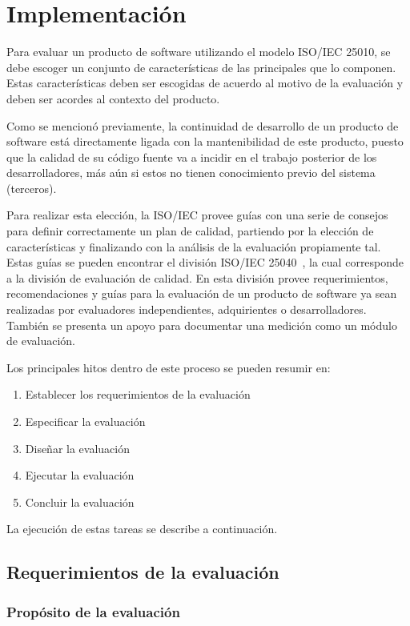 \chapter{Implementación}
Para evaluar un producto de software utilizando el modelo ISO/IEC 25010, se debe escoger un conjunto
de características de las principales que lo componen. Estas características deben ser escogidas de acuerdo
al motivo de la evaluación y deben ser acordes al contexto del producto.

Como se mencionó previamente, la continuidad de desarrollo de un producto de software está directamente
ligada con la mantenibilidad de este producto, puesto que la calidad de su código fuente va a incidir
en el trabajo posterior de los desarrolladores, más aún si estos no tienen conocimiento previo del sistema
(terceros).

Para realizar esta elección, la ISO/IEC provee guías con una serie de consejos para definir correctamente
un plan de calidad, partiendo por la elección de características y finalizando con la análisis de la evaluación
propiamente tal. Estas guías se pueden encontrar el división ISO/IEC 25040~\cite{25040}, la cual corresponde a la división
de evaluación de calidad. En esta división provee requerimientos, recomendaciones y guías para
la evaluación de un producto de software ya sean realizadas por evaluadores independientes, adquirientes o
desarrolladores. También se presenta un apoyo para documentar una medición como un módulo de evaluación.

Los principales hitos dentro de este proceso se pueden resumir en:
\begin{enumerate}
    \item Establecer los requerimientos de la evaluación
    \item Especificar la evaluación
    \item Diseñar la evaluación
    \item Ejecutar la evaluación
    \item Concluir la evaluación
\end{enumerate}

La ejecución de estas tareas se describe a continuación.

\section{Requerimientos de la evaluación}

\subsection{Propósito de la evaluación}

